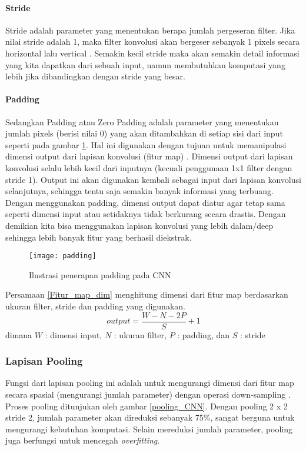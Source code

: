 \documentclass[../thesis.tex]{subfiles}
\begin{document}
\paragraph{Stride}

Stride adalah parameter yang menentukan berapa jumlah pergeseran filter. Jika nilai stride adalah 1, maka filter konvolusi akan bergeser sebanyak 1 pixels secara horizontal lalu vertical \cite{KarpathyCNN}. 
Semakin kecil stride maka akan semakin detail informasi yang kita dapatkan dari sebuah input, namun membutuhkan komputasi yang lebih jika dibandingkan dengan stride yang besar.

\paragraph{Padding}

Sedangkan Padding atau Zero Padding adalah parameter yang menentukan jumlah pixels (berisi nilai 0) yang akan ditambahkan di setiap sisi dari input seperti pada gambar \ref{padding_CNN}. Hal ini digunakan dengan tujuan untuk memanipulasi dimensi output dari lapisan konvolusi (fitur map) \cite{KarpathyCNN}.
Dimensi output dari lapisan konvolusi selalu lebih kecil dari inputnya (kecuali penggunaan 1x1 filter dengan stride 1). Output ini akan digunakan kembali sebagai input dari lapisan konvolusi selanjutnya, sehingga tentu saja semakin banyak informasi yang terbuang.
Dengan menggunakan padding, dimensi output dapat diatur agar tetap sama seperti dimensi input atau setidaknya tidak berkurang secara drastis. Dengan demikian kita bisa menggunakan lapisan konvolusi yang lebih dalam/deep sehingga lebih banyak fitur yang berhasil diekstrak.

\begin{figure}[htp]
	\centering
	\texttt{[image: padding]}
	\caption{Ilustrasi penerapan padding pada CNN}
	\label{padding_CNN}
\end{figure}

Persamaan \ref{Fitur_map_dim} menghitung dimensi dari fitur map berdasarkan ukuran filter, stride dan padding yang digunakan.
\begin{equation}\label{Fitur_map_dim}
	output =\frac {W-N-2P}{S}+1
\end{equation}
dimana $W$ : dimensi input, $N$ : ukuran filter, $P$ : padding, dan $S$ : stride


\subsubsection{Lapisan Pooling}
Fungsi dari lapisan pooling ini adalah untuk mengurangi dimensi dari fitur map secara spasial (mengurangi jumlah
parameter) dengan operasi down-sampling \cite{CNNinImageNet}. Proses pooling ditunjukan oleh gambar \ref{pooling_CNN}. Dengan pooling 2 x 2 stride 2, jumlah parameter akan direduksi sebanyak 75\%, sangat berguna untuk mengurangi kebutuhan komputasi. Selain
mereduksi jumlah parameter, pooling juga berfungsi untuk mencegah \textit{overfitting}.
\end{document}
